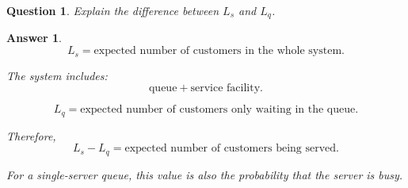 \documentclass[12pt]{article}
\newtheorem{question}{Question}
\newtheorem*{answer}{Answer}
\begin{document}
\begin{question}
Explain the difference between \(L_s\) and \(L_q\).
\end{question}

\begin{answer}
\[
L_s=\text{expected number of customers in the whole system}.
\]

The system includes:
\[
\text{queue}+\text{service facility}.
\]

\[
L_q=\text{expected number of customers only waiting in the queue}.
\]

Therefore,
\[
L_s-L_q=\text{expected number of customers being served}.
\]

For a single-server queue, this value is also the probability that the server is busy.
\end{answer}
\end{document}
